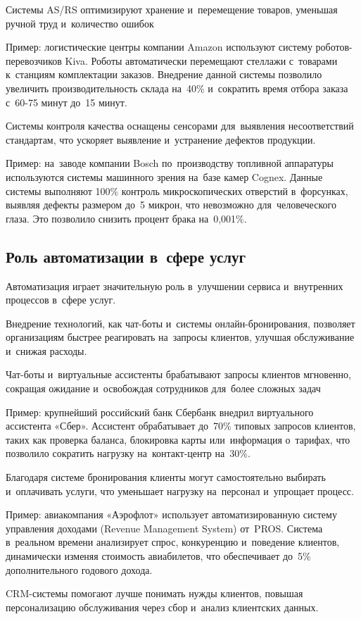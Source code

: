 \documentclass{ou}
\begin{document}
Системы AS/RS оптимизируют хранение и~перемещение товаров, уменьшая ручной труд и~количество ошибок

Пример: логистические центры компании Amazon используют систему роботов-перевозчиков Kiva. Роботы автоматически перемещают стеллажи с~товарами к~станциям комплектации заказов. Внедрение данной системы позволило увеличить производительность склада на~40\% и~сократить время отбора заказа с~60-75 минут до~15 минут.

Системы контроля качества оснащены сенсорами для~выявления несоответствий стандартам, что ускоряет выявление и~устранение дефектов продукции.

Пример: на~заводе компании Bosch по~производству топливной аппаратуры используются системы машинного зрения на~базе камер Cognex. Данные системы выполняют 100\% контроль микроскопических отверстий в~форсунках, выявляя дефекты размером до~5 микрон, что невозможно для~человеческого глаза. Это позволило снизить процент брака на~0,001\%.
\subsection{Роль автоматизации в~сфере услуг}
Автоматизация играет значительную роль в~улучшении сервиса и~внутренних процессов в~сфере услуг.

Внедрение технологий, как чат-боты и~системы онлайн-бронирования, позволяет организациям быстрее реагировать на~запросы клиентов, улучшая обслуживание и~снижая расходы.

Чат-боты и~виртуальные ассистенты брабатывают запросы клиентов мгновенно, сокращая ожидание и~освобождая сотрудников для~более сложных задач

Пример: крупнейший российский банк Сбербанк внедрил виртуального ассистента «Сбер». Ассистент обрабатывает до~70\% типовых запросов клиентов, таких как проверка баланса, блокировка карты или~информация о~тарифах, что позволило сократить нагрузку на~контакт-центр на~30\%.

Благодаря системе бронирования клиенты могут самостоятельно выбирать и~оплачивать услуги, что уменьшает нагрузку на~персонал и~упрощает процесс.

Пример: авиакомпания «Аэрофлот» использует автоматизированную систему управления доходами (Revenue Management System) от~PROS. Система в~реальном времени анализирует спрос, конкуренцию и~поведение клиентов, динамически изменяя стоимость авиабилетов, что обеспечивает до~5\% дополнительного годового дохода.

CRM-системы помогают лучше понимать нужды клиентов, повышая персонализацию обслуживания через сбор и~анализ клиентских данных.
\end{document}
